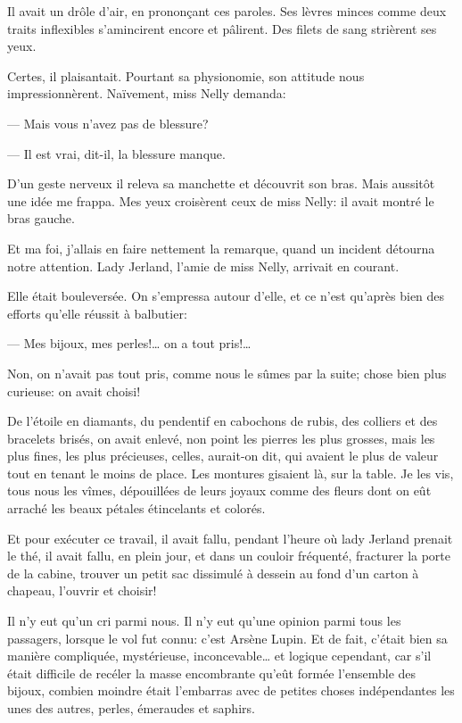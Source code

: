 \documentclass[12pt,a4paper]{book}
\begin{document}
Il avait un drôle d’air, en prononçant ces paroles. Ses lèvres minces comme deux traits inflexibles s’amincirent encore et pâlirent. Des filets de sang strièrent ses yeux.

Certes, il plaisantait. Pourtant sa physionomie, son attitude nous impressionnèrent. Naïvement, miss Nelly demanda:

— Mais vous n’avez pas de blessure?

— Il est vrai, dit-il, la blessure manque.

D’un geste nerveux il releva sa manchette et découvrit son bras. Mais aussitôt une idée me frappa. Mes yeux croisèrent ceux de miss Nelly: il avait montré le bras gauche.

Et ma foi, j’allais en faire nettement la remarque, quand un incident détourna notre attention. Lady Jerland, l’amie de miss Nelly, arrivait en courant.

Elle était bouleversée. On s’empressa autour d’elle, et ce n’est qu’après bien des efforts qu’elle réussit à balbutier:

— Mes bijoux, mes perles!… on a tout pris!…

Non, on n’avait pas tout pris, comme nous le sûmes par la suite; chose bien plus curieuse: on avait choisi!

De l’étoile en diamants, du pendentif en cabochons de rubis, des colliers et des bracelets brisés, on avait enlevé, non point les pierres les plus grosses, mais les plus fines, les plus précieuses, celles, aurait-on dit, qui avaient le plus de valeur tout en tenant le moins de place. Les montures gisaient là, sur la table. Je les vis, tous nous les vîmes, dépouillées de leurs joyaux comme des fleurs dont on eût arraché les beaux pétales étincelants et colorés.

Et pour exécuter ce travail, il avait fallu, pendant l’heure où lady Jerland prenait le thé, il avait fallu, en plein jour, et dans un couloir fréquenté, fracturer la porte de la cabine, trouver un petit sac dissimulé à dessein au fond d’un carton à chapeau, l’ouvrir et choisir!

Il n’y eut qu’un cri parmi nous. Il n’y eut qu’une opinion parmi tous les passagers, lorsque le vol fut connu: c’est Arsène Lupin. Et de fait, c’était bien sa manière compliquée, mystérieuse, inconcevable… et logique cependant, car s’il était difficile de recéler la masse encombrante qu’eût formée l’ensemble des bijoux, combien moindre était l’embarras avec de petites choses indépendantes les unes des autres, perles, émeraudes et saphirs.
\end{document}
